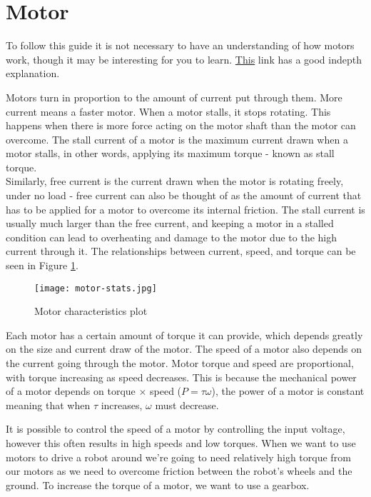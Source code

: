 \documentclass[../TinyBot.tex]{subfiles}
\begin{document}
    
\section{Motor} \label{sec:motor}

To follow this guide it is not necessary to have an understanding of how motors work, though it may be interesting for you to learn. \href{https://www.explainthatstuff.com/electricmotors.html}{This} link has a good indepth explanation. 

\bigskip


Motors turn in proportion to the amount of current put through them. More current means a faster motor. 
When a motor stalls, it stops rotating. This happens when there is more force acting on the motor shaft than the motor can overcome. The stall current of a motor is the maximum current drawn when a motor stalls, in other words, applying its maximum torque - known as stall torque. \\

Similarly, free current is the current drawn when the motor is rotating freely, under no load - free current can also be thought of as the amount of current that has to be applied for a motor to overcome its internal friction. The stall current is usually much larger than the free current, and keeping a motor in a stalled condition can lead to overheating and damage to the motor due to the high current through it. The relationships between current, speed, and torque can be seen in Figure \ref{fig:motor:stats}.

\begin{figure}[h!]
    \centering
    \texttt{[image: motor-stats.jpg]}
    \caption{Motor characteristics plot}
    \label{fig:motor:stats}
\end{figure}

\bigskip



Each motor has a certain amount of torque it can provide, which depends greatly on the size and current draw of the motor. The speed of a motor also depends on the current going through the motor. Motor torque and speed are proportional, with torque increasing as speed decreases. This is because the mechanical power of a motor depends on torque $\times$ speed ($P=\tau \omega$), the power of a motor is constant meaning that when $\tau$ increases, $\omega$ must decrease. 
\bigskip

It is possible to control the speed of a motor by controlling the input voltage, however this often results in high speeds and low torques. When we want to use motors to drive a robot around we're going to need relatively high torque from our motors as we need to overcome friction between the robot's wheels and the ground. To increase the torque of a motor, we want to use a gearbox. \\
\end{document}

